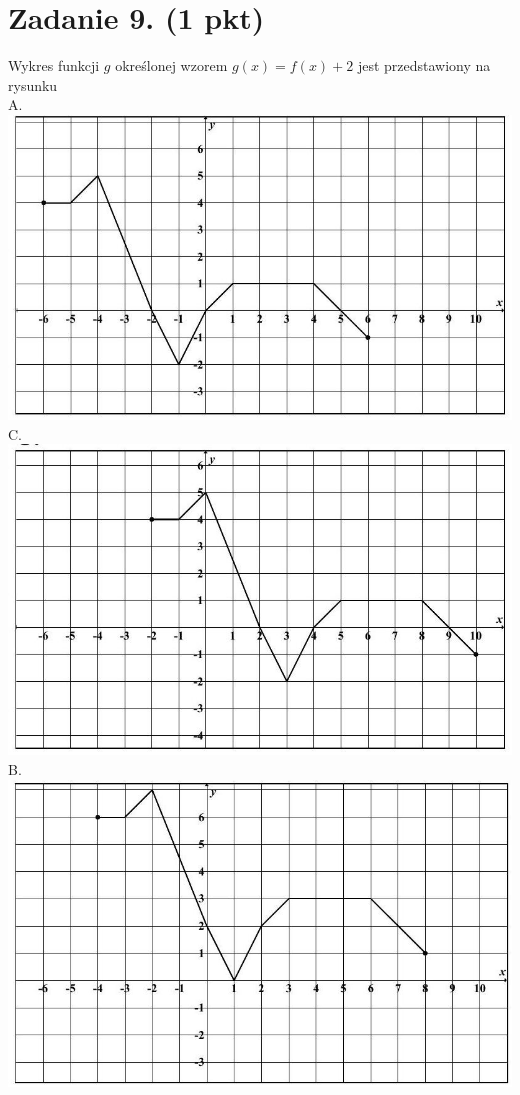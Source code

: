 \documentclass[10pt]{article}
\begin{document}
\section*{Zadanie 9. (1 pkt)}
Wykres funkcji \(g\) określonej wzorem \(g(x)=f(x)+2\) jest przedstawiony na rysunku\\
A.\\
\includegraphics[max width=\textwidth, center]{2024_11_21_603d5c1b2a7d8d68f45fg-04(2)}\\
C.\\
\includegraphics[max width=\textwidth, center]{2024_11_21_603d5c1b2a7d8d68f45fg-04}\\
B.\\
\includegraphics[max width=\textwidth, center]{2024_11_21_603d5c1b2a7d8d68f45fg-04(3)}\\
\end{document}
